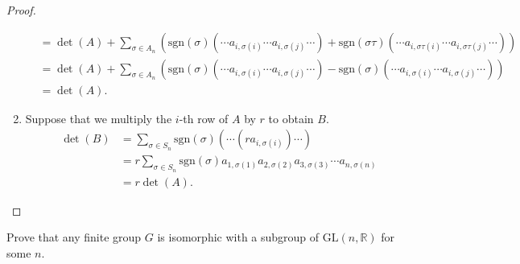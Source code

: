 \begin{proof}
\begin{enumerate}[label={\textbf{\alph*.}}]
\begin{align*}
                          & = \det(A) + \sum_{\sigma\in A_{n}}(\text{sgn}(\sigma)(\cdots a_{i,\sigma(i)}\cdots a_{i,\sigma(j)}\cdots) + \text{sgn}(\sigma\tau)(\cdots a_{i,\sigma\tau(i)}\cdots a_{i,\sigma\tau(j)}\cdots)) \\
                          & = \det(A) + \sum_{\sigma\in A_{n}}(\text{sgn}(\sigma)(\cdots a_{i,\sigma(i)}\cdots a_{i,\sigma(j)}\cdots) - \text{sgn}(\sigma)(\cdots a_{i,\sigma(i)}\cdots a_{i,\sigma(j)}\cdots))             \\
                          & = \det(A).
              \end{align*}
              \endgroup
        \item Suppose that we multiply the $i$-th row of $A$ by $r$ to obtain $B$.
              \begingroup
              \allowdisplaybreaks{}
              \begin{align*}
                  \det(B) & = \sum_{\sigma\in S_{n}}\text{sgn}(\sigma)(\cdots (ra_{i,\sigma(i)})\cdots)                                    \\
                          & = r\sum_{\sigma\in S_{n}}\text{sgn}(\sigma)a_{1,\sigma(1)}a_{2,\sigma(2)}a_{3,\sigma(3)}\cdots a_{n,\sigma(n)} \\
                          & = r\det(A).
              \end{align*}
              \endgroup
    \end{enumerate}
\end{proof}

\newpage
\begin{exercise}
    Prove that any finite group $G$ is isomorphic with a subgroup of $\text{GL}(n,\mathbb{R})$ for some $n$.
\end{exercise}

